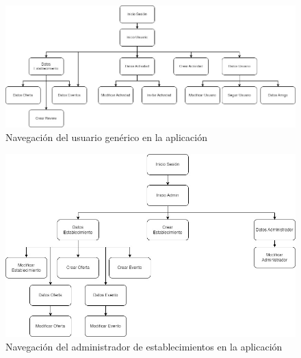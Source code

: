\clearpage
\begin{figure}[h]
    \centering
    \includegraphics[width=\linewidth]{imagenes/NavegacionUsuario.jpg}
    \caption{Navegación del usuario genérico en la aplicación}
    \label{fig:mi_imagen}
\end{figure}

\clearpage
\begin{figure}[h]
    \centering
    \includegraphics[width=\linewidth]{imagenes/NavegacionAdmin.jpg}
    \caption{Navegación del administrador de establecimientos en la aplicación}
    \label{fig:mi_imagen}
\end{figure}





